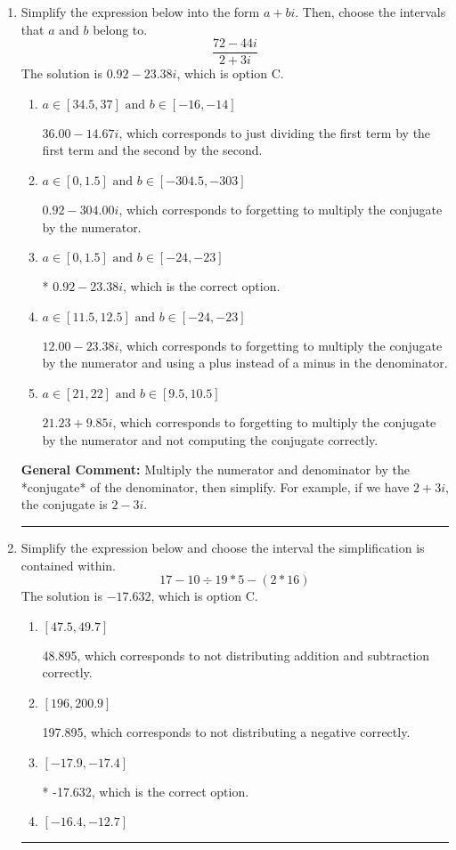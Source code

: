 \documentclass{extbook}[14pt]
\newcommand{\litem}[1]{\item #1

\rule{\textwidth}{0.4pt}}
\begin{document}
\begin{enumerate}\litem{
Simplify the expression below into the form $a+bi$. Then, choose the intervals that $a$ and $b$ belong to.
\[ \frac{72 - 44 i}{2 + 3 i} \]The solution is \( 0.92  - 23.38 i \), which is option C.\begin{enumerate}[label=\Alph*.]
\item \( a \in [34.5, 37] \text{ and } b \in [-16, -14] \)

 $36.00  - 14.67 i$, which corresponds to just dividing the first term by the first term and the second by the second.
\item \( a \in [0, 1.5] \text{ and } b \in [-304.5, -303] \)

 $0.92  - 304.00 i$, which corresponds to forgetting to multiply the conjugate by the numerator.
\item \( a \in [0, 1.5] \text{ and } b \in [-24, -23] \)

* $0.92  - 23.38 i$, which is the correct option.
\item \( a \in [11.5, 12.5] \text{ and } b \in [-24, -23] \)

 $12.00  - 23.38 i$, which corresponds to forgetting to multiply the conjugate by the numerator and using a plus instead of a minus in the denominator.
\item \( a \in [21, 22] \text{ and } b \in [9.5, 10.5] \)

 $21.23  + 9.85 i$, which corresponds to forgetting to multiply the conjugate by the numerator and not computing the conjugate correctly.
\end{enumerate}

\textbf{General Comment:} Multiply the numerator and denominator by the *conjugate* of the denominator, then simplify. For example, if we have $2+3i$, the conjugate is $2-3i$.
}
\litem{
Simplify the expression below and choose the interval the simplification is contained within.
\[ 17 - 10 \div 19 * 5 - (2 * 16) \]The solution is \( -17.632 \), which is option C.\begin{enumerate}[label=\Alph*.]
\item \( [47.5, 49.7] \)

 48.895, which corresponds to not distributing addition and subtraction correctly.
\item \( [196, 200.9] \)

 197.895, which corresponds to not distributing a negative correctly.
\item \( [-17.9, -17.4] \)

* -17.632, which is the correct option.
\item \( [-16.4, -12.7] \)


\end{enumerate}}
\end{enumerate}
\end{document}
